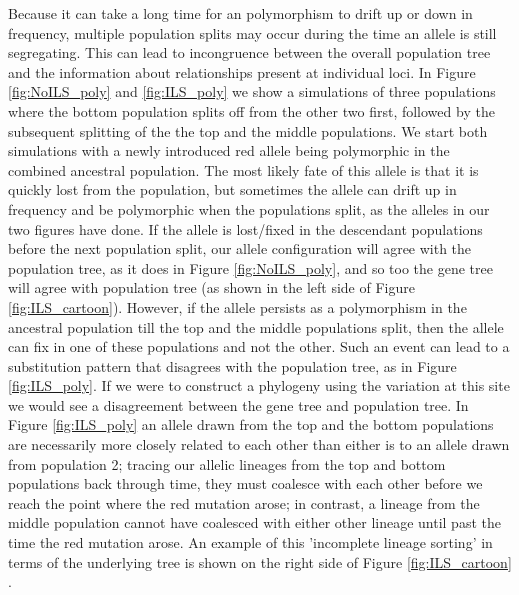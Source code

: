 Because it can take a long time for an polymorphism to drift up or down in frequency, multiple population splits may occur during the time an allele is still segregating. This can lead to incongruence between the overall population tree and the information about relationships present at
individual loci. In Figure \ref{fig:NoILS_poly} and \ref{fig:ILS_poly}
we show a simulations of three populations where the bottom population splits off from the other two first, followed by the subsequent splitting of the the top and the middle populations. We start both simulations with a newly
introduced red allele being polymorphic in the combined ancestral population. The most likely fate of this allele is that it is
quickly lost from the population, but sometimes the allele can drift up in frequency and be polymorphic when the populations split, as the alleles in our two figures have done. If the allele is lost/fixed in the descendant populations before the next population split, our allele
configuration will agree with the population tree, as it does in
Figure  \ref{fig:NoILS_poly}, and so too the gene tree will agree with population tree (as shown in the left side of Figure \ref{fig:ILS_cartoon}). 
However, if the allele persists as a polymorphism in the ancestral population till the top and the middle
populations split, then the allele can fix in one of these populations
and not the other. Such an event can lead to a substitution pattern
that disagrees with the population tree, as in Figure \ref{fig:ILS_poly}.  If
we were to construct a phylogeny using the variation at this site we would see a disagreement between the gene tree and population tree. In Figure \ref{fig:ILS_poly} an allele
drawn from the top and the bottom populations are
necessarily more closely related to each other than either is to an allele drawn from population 2; 
tracing our allelic lineages from the top and bottom populations back through time, they must coalesce with each other before we reach the point where the red mutation arose; in contrast, a lineage from the middle population cannot have coalesced with either other lineage until past the time the red mutation arose. An example of this 'incomplete lineage sorting' in terms of the underlying tree is shown on the right side of Figure \ref{fig:ILS_cartoon} . 



